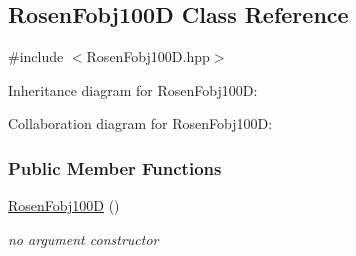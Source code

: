 \hypertarget{classRosenFobj100D}{\subsection{\-Rosen\-Fobj100\-D \-Class \-Reference}
\label{classRosenFobj100D}
}


{\ttfamily \#include $<$\-Rosen\-Fobj100\-D.\-hpp$>$}



\-Inheritance diagram for \-Rosen\-Fobj100\-D\-:


\-Collaboration diagram for \-Rosen\-Fobj100\-D\-:
\subsubsection*{\-Public \-Member \-Functions}
\begin{DoxyCompactItemize}
\item 
\hyperlink{classRosenFobj100D_aadc1a8fbb4595b69eb978b1e3e4683e1}{\-Rosen\-Fobj100\-D} ()
\begin{DoxyCompactList}\small\item\em no argument constructor \end{DoxyCompactList}\item 

\end{DoxyCompactItemize}

